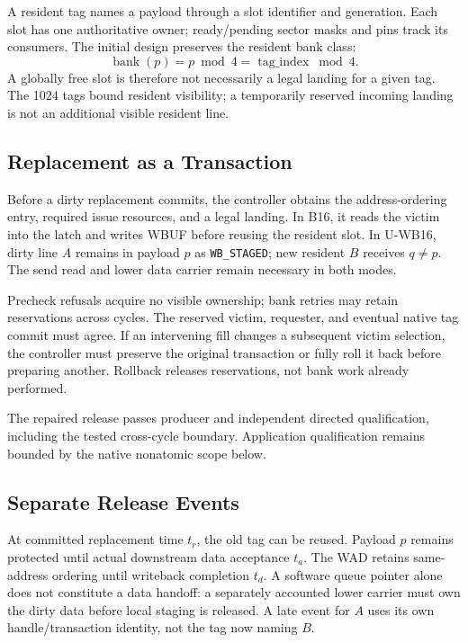 \documentclass[conference,letterpaper]{IEEEtran}
\begin{document}
A resident tag names a payload through a slot identifier and generation. Each slot has one authoritative owner; ready/pending sector masks and pins track its consumers. The initial design preserves the resident bank class:
\begin{equation}
 \operatorname{bank}(p)=p\bmod4=\operatorname{tag\_index}\bmod4.
\label{eq:bank}
\end{equation}
A globally free slot is therefore not necessarily a legal landing for a given tag. The 1024 tags bound resident visibility; a temporarily reserved incoming landing is not an additional visible resident line.

\subsection{Replacement as a Transaction}
Before a dirty replacement commits, the controller obtains the address-ordering entry, required issue resources, and a legal landing. In B16, it reads the victim into the latch and writes WBUF before reusing the resident slot. In U-WB16, dirty line $A$ remains in payload $p$ as \texttt{WB\_STAGED}; new resident $B$ receives $q\ne p$. The send read and lower data carrier remain necessary in both modes.

Precheck refusals acquire no visible ownership; bank retries may retain reservations across cycles. The reserved victim, requester, and eventual native tag commit must agree. If an intervening fill changes a subsequent victim selection, the controller must preserve the original transaction or fully roll it back before preparing another. Rollback releases reservations, not bank work already performed.

The repaired release passes producer and independent directed qualification, including the tested cross-cycle boundary. Application qualification remains bounded by the native nonatomic scope below.

\subsection{Separate Release Events}
At committed replacement time $t_r$, the old tag can be reused. Payload $p$ remains protected until actual downstream data acceptance $t_a$. The WAD retains same-address ordering until writeback completion $t_d$. A software queue pointer alone does not constitute a data handoff: a separately accounted lower carrier must own the dirty data before local staging is released. A late event for $A$ uses its own handle/transaction identity, not the tag now naming $B$.
\end{document}
